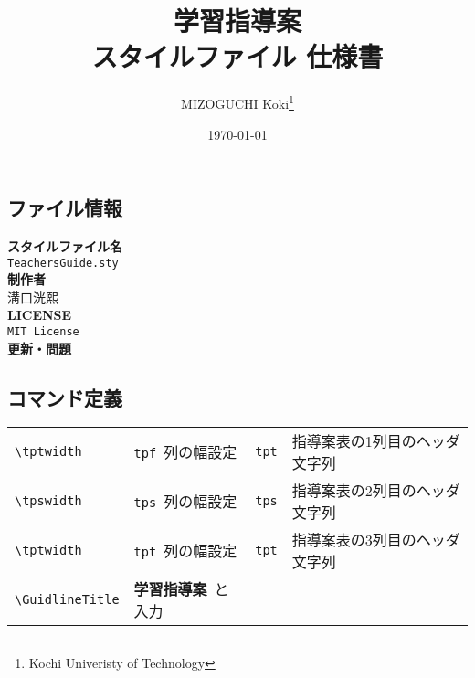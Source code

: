\documentclass[paper=a4,fontsize=10.5pt]{jlreq}
\title{\textbf{学習指導案}\\ \LaTeXe スタイルファイル 仕様書}
\author{MIZOGUCHI Koki\thanks{Kochi Univeristy of Technology}}
\date{\today}
\begin{document}
\maketitle
\begin{leftbar}
    \section*{ファイル情報}
\end{leftbar}
\begin{framed}
    \begin{multicols}{2}
        \noindent\textbf{スタイルファイル名}\\
        \hspace{0.5em}\verb|TeachersGuide.sty|\\
        \textbf{制作者}\\
        \hspace{0.5em}溝口洸熙\\
        \newline
        \textbf{LICENSE}\\
        \hspace{0.5em}\verb|MIT License|\\
        \textbf{更新・問題}\\
    \end{multicols}
\end{framed}
\begin{leftbar}
    \section*{コマンド定義}
\end{leftbar}
\begin{table}[h]
    \begin{tabular}{ll|ll}
        \verb|\tptwidth|      & \verb|tpf|\ 列の幅設定      & \verb|tpt| & 指導案表の1列目のヘッダ文字列 \\
        \verb|\tpswidth|      & \verb|tps|\ 列の幅設定      & \verb|tps| & 指導案表の2列目のヘッダ文字列 \\
        \verb|\tptwidth|      & \verb|tpt|\ 列の幅設定      & \verb|tpt| & 指導案表の3列目のヘッダ文字列 \\
        \verb|\GuidlineTitle| & \textbf{学習指導案}\ と入力
    \end{tabular}
\end{table}
\end{document}
